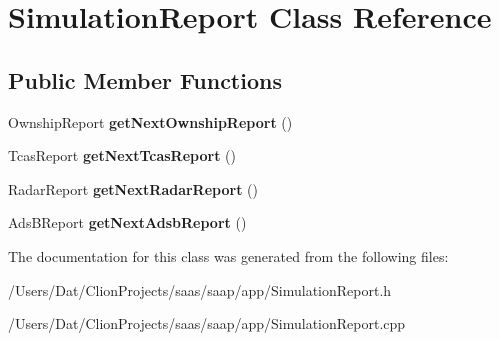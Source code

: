 \hypertarget{class_simulation_report}{}\section{Simulation\+Report Class Reference}
\label{class_simulation_report}
\subsection*{Public Member Functions}
\begin{DoxyCompactItemize}
\item 
Ownship\+Report {\bfseries get\+Next\+Ownship\+Report} ()\hypertarget{class_simulation_report_a75ee5df9afd639a9fa8223d587d3cc35}{}\label{class_simulation_report_a75ee5df9afd639a9fa8223d587d3cc35}

\item 
Tcas\+Report {\bfseries get\+Next\+Tcas\+Report} ()\hypertarget{class_simulation_report_a8496265382424b82207b98122c872262}{}\label{class_simulation_report_a8496265382424b82207b98122c872262}

\item 
Radar\+Report {\bfseries get\+Next\+Radar\+Report} ()\hypertarget{class_simulation_report_aa83b2ee8f95f9149b5f26ab11f84cfc8}{}\label{class_simulation_report_aa83b2ee8f95f9149b5f26ab11f84cfc8}

\item 
Ads\+B\+Report {\bfseries get\+Next\+Adsb\+Report} ()\hypertarget{class_simulation_report_a2762e819b3d3210ebcdc8716addb3eab}{}\label{class_simulation_report_a2762e819b3d3210ebcdc8716addb3eab}

\end{DoxyCompactItemize}


The documentation for this class was generated from the following files\+:\begin{DoxyCompactItemize}
\item 
/\+Users/\+Dat/\+Clion\+Projects/saas/saap/app/Simulation\+Report.\+h\item 
/\+Users/\+Dat/\+Clion\+Projects/saas/saap/app/Simulation\+Report.\+cpp\end{DoxyCompactItemize}
